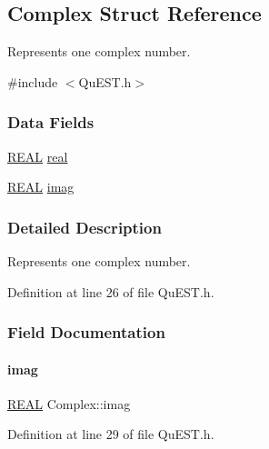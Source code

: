 \hypertarget{structComplex}{}\subsection{Complex Struct Reference}
\label{structComplex}


Represents one complex number.  




{\ttfamily \#include $<$Qu\+E\+S\+T.\+h$>$}

\subsubsection*{Data Fields}
\begin{DoxyCompactItemize}
\item 
\mbox{\hyperlink{QuEST__precision_8h_a4b654506f18b8bfd61ad2a29a7e38c25}{R\+E\+AL}} \mbox{\hyperlink{structComplex_a479ad939835457595fcca3ca55c06283}{real}}
\item 
\mbox{\hyperlink{QuEST__precision_8h_a4b654506f18b8bfd61ad2a29a7e38c25}{R\+E\+AL}} \mbox{\hyperlink{structComplex_a1151948284b21c0052f203f23ab931d9}{imag}}
\end{DoxyCompactItemize}


\subsubsection{Detailed Description}
Represents one complex number. 

Definition at line 26 of file Qu\+E\+S\+T.\+h.



\subsubsection{Field Documentation}
\mbox{\label{structComplex_a1151948284b21c0052f203f23ab931d9}} 
\paragraph{\texorpdfstring{imag}{imag}}
{\footnotesize\ttfamily \mbox{\hyperlink{QuEST__precision_8h_a4b654506f18b8bfd61ad2a29a7e38c25}{R\+E\+AL}} Complex\+::imag}



Definition at line 29 of file Qu\+E\+S\+T.\+h.



